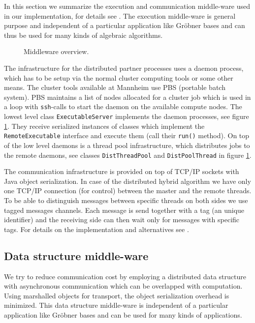 \documentclass[10pt,twocolumn,a4paper]{article}
\newcommand{\code}[1]{\texttt{#1}}
\begin{document}
In this section we summarize the execution and communication
middle-ware used in our implementation, for details see
\cite{Kredel:2009,Kredel:2010}.  The execution middle-ware is general
purpose and independent of a particular application like Gr\"obner
bases and can thus be used for many kinds of algebraic algorithms.

\begin{figure}[thb]
\centering
{}
\caption{Middleware overview.}
\label{fig:middleware}
\end{figure}

The infrastructure for the distributed partner processes uses a daemon
process, which has to be setup via the normal cluster computing tools
or some other means. The cluster tools available at Mannheim use PBS
(portable batch system). PBS maintains a list of nodes allocated for a
cluster job which is used in a loop with \code{ssh}-calls to start the daemon on the available
compute nodes.  The lowest level class \code{Exe\-cut\-able\-Server}
implements the daemon processes, see figure \ref{fig:middleware}.
They receive serialized instances of classes which implement the
\code{Remote\-Executable} interface and execute them (call their
\code{run()} method).  On top of the low level daemons is a thread
pool infrastructure, which distributes jobs to the remote daemons, see
classes \code{Dist\-Thread\-Pool} and \code{Dist\-Pool\-Thread} in
figure \ref{fig:middleware}.

The communication infrastructure is provided on top of TCP/IP sockets
with Java object serialization. In case of the distributed hybrid
algorithm we have only one TCP/IP connection (for control) between the
master and the remote threads. To be able to distinguish messages
between specific threads on both sides we use tagged messages
channels.  Each message is send together with a tag (an unique
identifier) and the receiving side can then wait only for messages
with specific tags. For details on the implementation and alternatives
see \cite{Kredel:2010}.


\subsection{Data structure middle-ware} 

We try to reduce communication cost by employing a distributed data
structure with asynchronous communication which can be overlapped with
computation.  Using marshalled objects for transport, the object
serialization overhead is minimized.  This data structure middle-ware
is independent of a particular application like Gr\"obner bases and
can be used for many kinds of applications.
\end{document}
